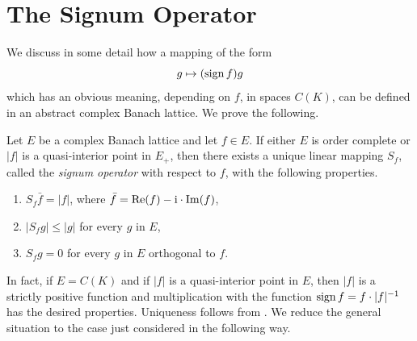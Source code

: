 \section{The Signum Operator}\label{sec:c1-8}%
We discuss in some detail how a mapping of the form
\[
g \mapsto (\operatorname{sign} f )g
\]
which has an obvious meaning, depending on $ f $, in spaces $ C(K) $, can be defined in an abstract complex Banach lattice.
We prove the following.
\begin{proposition*}
Let $ E $ be a complex Banach lattice and let $ f \in E $.
If either $ E $ is order complete or $ |f| $ is a quasi-interior point in $ E_{+} $, then there exists a unique linear mapping $ S_{f} $, called the \emph{signum operator} with respect to $ f $, with the following properties.
\begin{enumerate}[\upshape (i)]

\item  
$ S_{f}\bar{f} = |f| $, where $ \bar{f} = \mathop{}\!\mathrm{Re}(f) -  \mathrm{i} \cdot\mathop{}\!\mathrm{Im}(f) $,

\item 
$ |S_{f}g| \leq |g| $ for every $ g $ in $ E $,

\item 
$ S_{f}g = 0 $ for every $ g $ in $ E $ orthogonal to $ f $.
\end{enumerate}
\end{proposition*}
In fact, if\/ $ E = C(K) $ and if\/ $ |f| $ is a quasi-interior point in $ E $, then $ |f| $ is a strictly positive function and multiplication with the function $ \operatorname{sign} f = f\cdot|f|^{-1} $ has the desired properties.
Uniqueness follows from \textcite[Chap. 20]{zaanen:1983}.
We reduce the general situation to the case just considered in the following way.
